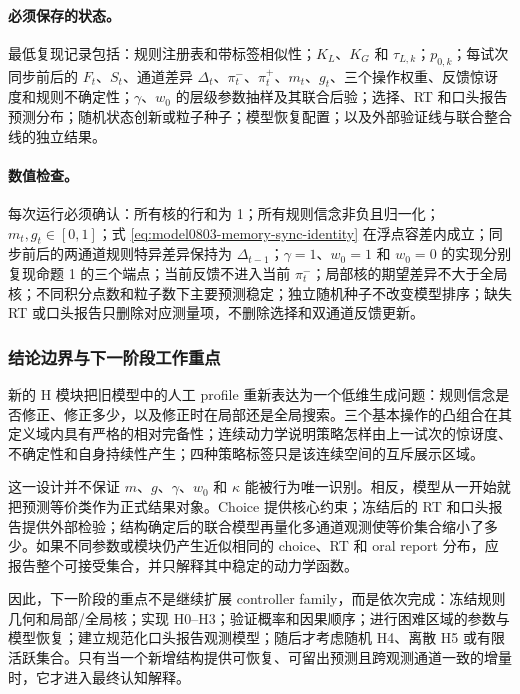 \paragraph{必须保存的状态。}
最低复现记录包括：规则注册表和带标签相似性；$K_L$、$K_G$ 和 $\tau_{L,k}$；$p_{0,k}$；每试次同步前后的 $F_t$、$S_t$、通道差异 $\Delta_t$、$\pi^-_t$、$\pi^+_t$、$m_t$、$g_t$、三个操作权重、反馈惊讶度和规则不确定性；$\gamma$、$w_0$ 的层级参数抽样及其联合后验；选择、RT 和口头报告预测分布；随机状态创新或粒子种子；模型恢复配置；以及外部验证线与联合整合线的独立结果。

\paragraph{数值检查。}
每次运行必须确认：所有核的行和为 1；所有规则信念非负且归一化；$m_t,g_t\in[0,1]$；式 \ref{eq:model0803-memory-sync-identity} 在浮点容差内成立；同步前后的两通道规则特异差异保持为 $\Delta_{t-1}$；$\gamma=1$、$w_0=1$ 和 $w_0=0$ 的实现分别复现命题 1 的三个端点；当前反馈不进入当前 $\pi^-_t$；局部核的期望差异不大于全局核；不同积分点数和粒子数下主要预测稳定；独立随机种子不改变模型排序；缺失 RT 或口头报告只删除对应测量项，不删除选择和双通道反馈更新。


\subsubsection{结论边界与下一阶段工作重点}

新的 H 模块把旧模型中的人工 profile 重新表达为一个低维生成问题：规则信念是否修正、修正多少，以及修正时在局部还是全局搜索。三个基本操作的凸组合在其定义域内具有严格的相对完备性；连续动力学说明策略怎样由上一试次的惊讶度、不确定性和自身持续性产生；四种策略标签只是该连续空间的互斥展示区域。

这一设计并不保证 $m$、$g$、$\gamma$、$w_0$ 和 $\kappa$ 能被行为唯一识别。相反，模型从一开始就把预测等价类作为正式结果对象。Choice 提供核心约束；冻结后的 RT 和口头报告提供外部检验；结构确定后的联合模型再量化多通道观测使等价集合缩小了多少。如果不同参数或模块仍产生近似相同的 choice、RT 和 oral report 分布，应报告整个可接受集合，并只解释其中稳定的动力学函数。

因此，下一阶段的重点不是继续扩展 controller family，而是依次完成：冻结规则几何和局部/全局核；实现 H0--H3；验证概率和因果顺序；进行困难区域的参数与模型恢复；建立规范化口头报告观测模型；随后才考虑随机 H4、离散 H5 或有限活跃集合。只有当一个新增结构提供可恢复、可留出预测且跨观测通道一致的增量时，它才进入最终认知解释。
